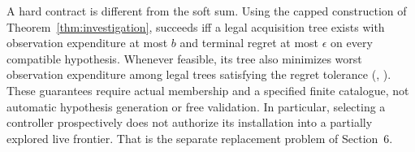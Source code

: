 A hard contract is different from the soft sum. Using the capped construction of Theorem~\ref{thm:investigation},  succeeds iff a legal acquisition tree exists with observation expenditure at most $b$ and terminal regret at most $\epsilon$ on every compatible hypothesis. Whenever feasible, its tree also minimizes worst observation expenditure among legal trees satisfying the regret tolerance (, ). These guarantees require actual membership and a specified finite catalogue, not automatic hypothesis generation or free validation. In particular, selecting a controller prospectively does not authorize its installation into a partially explored live frontier. That is the separate replacement problem of Section~6.
